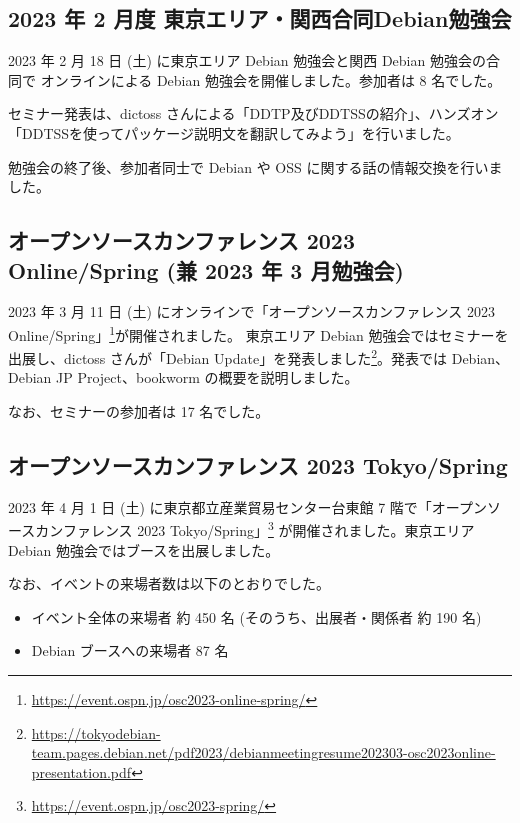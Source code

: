 \documentclass[mingoth,a4paper]{jsarticle}
\begin{document}

\subsection{2023 年 2 月度 東京エリア・関西合同Debian勉強会}

2023 年 2 月 18 日 (土) に東京エリア Debian 勉強会と関西 Debian 勉強会の合同で
オンラインによる Debian 勉強会を開催しました。参加者は 8 名でした。

セミナー発表は、dictoss さんによる「DDTP及びDDTSSの紹介」、ハンズオン「DDTSSを使ってパッケージ説明文を翻訳してみよう」を行いました。

勉強会の終了後、参加者同士で Debian や OSS に関する話の情報交換を行いました。

\subsection{オープンソースカンファレンス 2023 Online/Spring (兼 2023 年 3 月勉強会)}

2023 年 3 月 11 日 (土) にオンラインで「オープンソースカンファレンス 2023 Online/Spring」\footnote{\url{https://event.ospn.jp/osc2023-online-spring/}}が開催されました。
東京エリア Debian 勉強会ではセミナーを出展し、dictoss さんが「Debian Update」を発表しました\footnote{\url{https://tokyodebian-team.pages.debian.net/pdf2023/debianmeetingresume202303-osc2023online-presentation.pdf}}。発表では Debian、Debian JP Project、bookworm の概要を説明しました。

なお、セミナーの参加者は 17 名でした。
  
\subsection{オープンソースカンファレンス 2023 Tokyo/Spring}

2023 年 4 月 1 日 (土) に東京都立産業貿易センター台東館 7 階で「オープンソースカンファレンス 2023 Tokyo/Spring」\footnote{\url{https://event.ospn.jp/osc2023-spring/}} が開催されました。東京エリア Debian 勉強会ではブースを出展しました。

なお、イベントの来場者数は以下のとおりでした。

\begin{itemize}
\item イベント全体の来場者 約 450 名 (そのうち、出展者・関係者 約 190 名)
\item Debian ブースへの来場者 87 名
\end{itemize}
\end{document}
